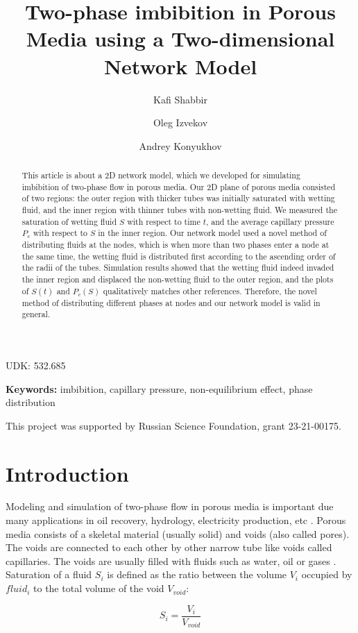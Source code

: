 \documentclass[
	12pt
] {article}
\title{Two-phase imbibition in Porous Media using a Two-dimensional Network Model}
\author[1, 2]{Kafi Shabbir}
\author[1, 3]{Oleg Izvekov}
\author[1, 4]{Andrey Konyukhov}
\affil[1]{Moscow Institute of Physics and Technology, Dolgoprudny, 141701}
\affil[2]{kafiulshabbir@phystech.edu}
\affil[3]{izvekov\_o@inbox.ru}
\affil[4]{konyukhov\_av@mail.ru}
\begin{document}
\nocite{*}
\maketitle
UDK: 532.685

\begin{abstract}
	 This article is about a 2D network model, which we developed for simulating imbibition of two-phase flow in porous media. Our 2D plane of porous media consisted of two regions: the outer region with thicker tubes was initially saturated with wetting fluid, and the inner region with thinner tubes with non-wetting fluid. We measured the saturation of wetting fluid $S$  with respect to time $t$, and the average capillary pressure $P_c$ with respect to $S$ in the inner region. Our network model used a novel method of distributing fluids at the nodes, which is when more than two phases enter a node at the same time, the wetting fluid is distributed first according to the ascending order of the radii of the tubes. Simulation results showed that the wetting fluid indeed invaded the inner region and displaced the non-wetting fluid to the outer region, and the plots of $S(t)$ and $P_c(S)$ qualitatively matches other references. Therefore, the novel method of distributing different phases at nodes and our network model is valid in general.
\end{abstract}

\textbf{Keywords:} imbibition, capillary pressure, non-equilibrium effect, phase distribution

This project was supported by Russian Science Foundation, grant 23-21-00175.

\section{Introduction} \label{sec:intro}
	Modeling and simulation of two-phase flow in porous media is important due many applications in oil recovery, hydrology, electricity production, etc \cite{labed2012experimental}. Porous media consists of a skeletal material (usually solid) and voids (also called pores). The voids are connected to each other by other narrow tube like voids called capillaries. The voids are usually filled with fluids such as water, oil or gases \cite{su2012insights}. Saturation of a fluid $S_i$ is defined as the ratio between the volume $V_{i}$ occupied by ${fluid}_i$ to the total volume of the void $V_{void}$:
	
	\begin{equation}
		S_{i} = \frac{V_{i}}{V_{void}}
	\end{equation}
	
\end{document}

